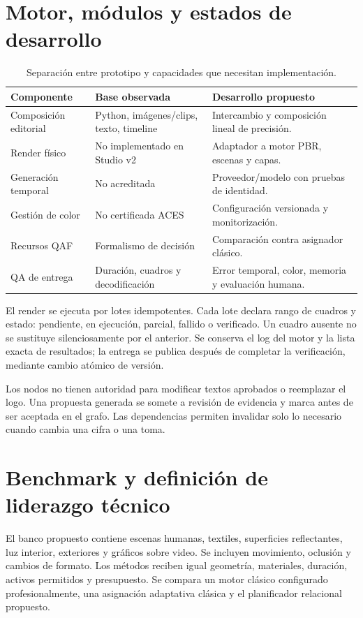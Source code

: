 \section{Motor, módulos y estados de desarrollo}
\begin{table}[ht]\centering\compacttable
\begin{tabular}{p{.27\linewidth}p{.31\linewidth}p{.31\linewidth}}\toprule
Componente & Base observada & Desarrollo propuesto \\\midrule
Composición editorial & Python, imágenes/clips, texto, timeline & Intercambio y composición lineal de precisión.\\
Render físico & No implementado en Studio v2 & Adaptador a motor PBR, escenas y capas.\\
Generación temporal & No acreditada & Proveedor/modelo con pruebas de identidad.\\
Gestión de color & No certificada ACES & Configuración versionada y monitorización.\\
Recursos QAF & Formalismo de decisión & Comparación contra asignador clásico.\\
QA de entrega & Duración, cuadros y decodificación & Error temporal, color, memoria y evaluación humana.\\\bottomrule
\end{tabular}\caption{Separación entre prototipo y capacidades que necesitan implementación.}
\end{table}

El render se ejecuta por lotes idempotentes. Cada lote declara rango de cuadros y estado: pendiente, en ejecución, parcial, fallido o verificado. Un cuadro ausente no se sustituye silenciosamente por el anterior. Se conserva el log del motor y la lista exacta de resultados; la entrega se publica después de completar la verificación, mediante cambio atómico de versión.

Los nodos no tienen autoridad para modificar textos aprobados o reemplazar el logo. Una propuesta generada se somete a revisión de evidencia y marca antes de ser aceptada en el grafo. Las dependencias permiten invalidar solo lo necesario cuando cambia una cifra o una toma.

\section{Benchmark y definición de liderazgo técnico}
El banco propuesto contiene escenas humanas, textiles, superficies reflectantes, luz interior, exteriores y gráficos sobre video. Se incluyen movimiento, oclusión y cambios de formato. Los métodos reciben igual geometría, materiales, duración, activos permitidos y presupuesto. Se compara un motor clásico configurado profesionalmente, una asignación adaptativa clásica y el planificador relacional propuesto.

